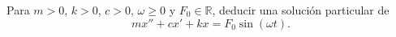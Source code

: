 Para \(m>0\), \(k>0\), \(c>0\), \(\omega\ge0\) y \(F_0\in\mathbb R\), deducir una solución particular de
\[mx''+cx'+kx=F_0\sin(\omega t).\]
